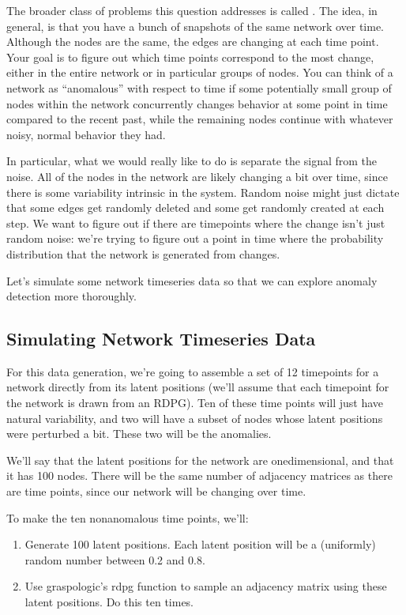 \documentclass[letterpaper,10pt,english]{jupyterBook}
\begin{document}
\sphinxAtStartPar
The broader class of problems this question addresses is called . The idea, in general, is that you have a bunch of snapshots of the same network over time. Although the nodes are the same, the edges are changing at each time point. Your goal is to figure out which time points correspond to the most change, either in the entire network or in particular groups of nodes. You can think of a network as “anomalous” with respect to time if some potentially small group of nodes within the network concurrently changes behavior at some point in time compared to the recent past, while the remaining nodes continue with whatever noisy, normal behavior they had.

\sphinxAtStartPar
In particular, what we would really like to do is separate the signal from the noise. All of the nodes in the network are likely changing a bit over time, since there is some variability intrinsic in the system. Random noise might just dictate that some edges get randomly deleted and some get randomly created at each step. We want to figure out if there are timepoints where the change isn’t just random noise: we’re trying to figure out a point in time where the probability distribution that the network  is generated from changes.

\sphinxAtStartPar
Let’s simulate some network timeseries data so that we can explore anomaly detection more thoroughly.


\subsection{Simulating Network Timeseries Data}
\label{\detokenize{applications/ch10/anomaly-detection:simulating-network-timeseries-data}}
\sphinxAtStartPar
For this data generation, we’re going to assemble a set of 12 time\sphinxhyphen{}points for a network directly from its latent positions (we’ll assume that each time\sphinxhyphen{}point for the network is drawn from an RDPG). Ten of these time points will just have natural variability, and two will have a subset of nodes whose latent positions were perturbed a bit. These two will be the anomalies.

\sphinxAtStartPar
We’ll say that the latent positions for the network are one\sphinxhyphen{}dimensional, and that it has 100 nodes. There will be the same number of adjacency matrices as there are time points, since our network will be changing over time.

\sphinxAtStartPar
To make the ten non\sphinxhyphen{}anomalous time points, we’ll:
\begin{enumerate}
%
\item {} 
\sphinxAtStartPar
Generate 100 latent positions. Each latent position will be a (uniformly) random number between 0.2 and 0.8.

\item {} 
\sphinxAtStartPar
Use graspologic’s rdpg function to sample an adjacency matrix using these latent positions. Do this ten times.

\end{enumerate}
\end{document}
